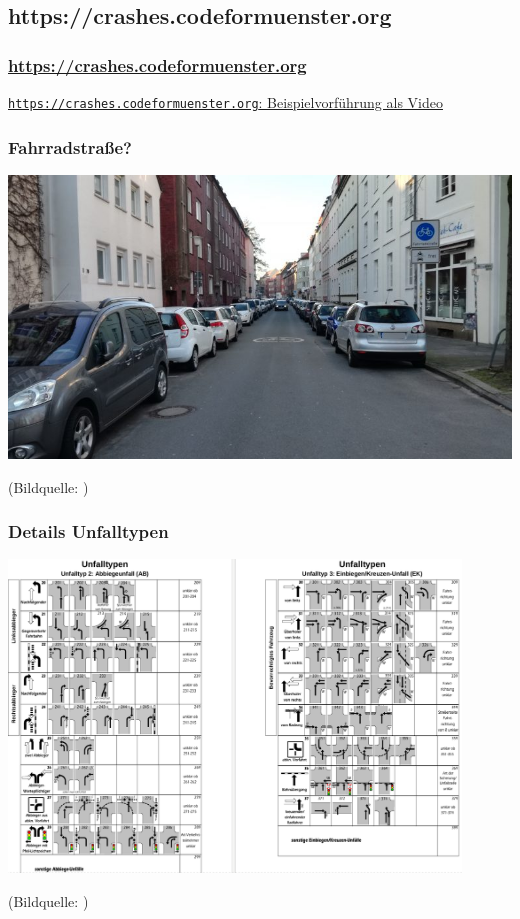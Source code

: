 \documentclass{beamer}
\begin{document}
\subsection{https://crashes.codeformuenster.org}

\begin{frame}
  \frametitle{\url{https://crashes.codeformuenster.org}}
  
  \href{beispielpraesentation-crashes.mkv}{\texttt{https://crashes.codeformuenster.org}: Beispielvorführung als Video}
  
\end{frame}

\begin{frame}
  \frametitle{Fahrradstraße?}
  
  \centering
  
  \includegraphics[width=\textwidth]{img/schillerstrasse.jpg}
  
  \vfill  
  {\scriptsize (Bildquelle: \cite{Chrobak2018})}
\end{frame}

\begin{frame}
  \frametitle{Details Unfalltypen}
  \centering
  
  \includegraphics[width=0.9\textwidth]{img/unfalltyp-details.png}
  
  \vfill
  {\scriptsize (Bildquelle: \cite[\href{https://recht.nrw.de/lmi/owa/br_show_anlage?p_id=15549}{Anlage 9}]{IMNRW2019})\par}
\end{frame}
\end{document}
